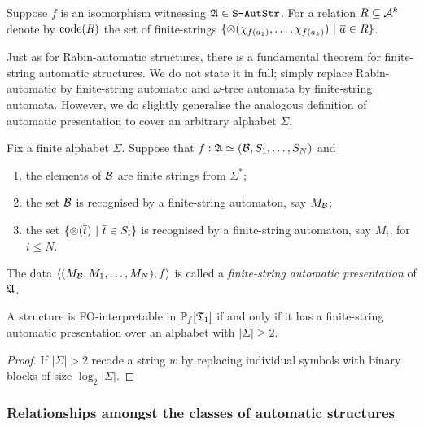 \begin{definition}
Suppose $f$ is an isomorphism witnessing $\mathfrak{A} \in \mbox{\tt S-AutStr}$. For a relation $R \subseteq {\mathcal A}^k$ denote by
${\rm code}({R})$ the set of finite-strings  $\{\otimes(\chi_{f(a_1)},\dots,\chi_{f(a_k)}) \ \vert \   \mbox{$\overline {a}$} \in R\}$. 
\end{definition}

Just as for Rabin-automatic structures, there is a fundamental theorem for finite-string automatic structures. We do not state it in full;
simply replace Rabin-automatic by finite-string automatic and $\omega$-tree automata by finite-string automata.
However, we do slightly generalise the analogous definition of automatic presentation to cover an arbitrary alphabet $\Sigma$.

\begin{definition} \label{AS:dfn:fsap}
Fix a finite alphabet $\Sigma$. Suppose that $f: \mathfrak{A} \simeq  ({\mathcal B},S_1,\dots,S_N)$ and
\begin{enumerate}
\item the elements of ${\mathcal B}$ are finite strings from $\Sigma^\ast$;
\item the set ${\mathcal B}$ is recognised by a finite-string automaton, say $M_{\mathcal B}$; 
\item the set $\{\otimes(\mbox{$\overline {t}$}) \ \vert \  \mbox{$\overline {t}$} \in S_i\}$ is recognised by a finite-string automaton, say $M_i$, for $i \leq N$.
\end{enumerate}
The data $\left<(M_{\mathcal B},M_1,\dots,M_N), f \right>$ is called a {\em finite-string automatic presentation} of $\mathfrak{A}$.
\end{definition}

\begin{proposition} \label{AS:prop:MTC}
A structure is FO-interpretable in ${\mathbb P}_f[\mathfrak{T}_1]$ if and only if it 
has a finite-string automatic presentation over an alphabet with $|\Sigma| \geq 2$.
\end{proposition}

\begin{proof}
If $|\Sigma| > 2$ recode a string $w$ by replacing individual symbols with binary blocks of size $\log_2 |\Sigma|$.
\end{proof}

\subsubsection*{Relationships amongst the classes of automatic structures}

